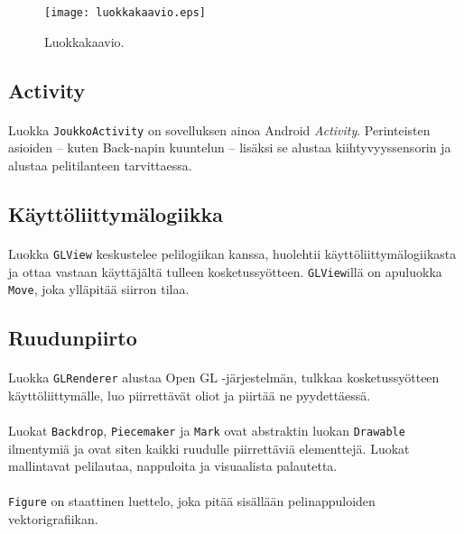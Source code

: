 \documentclass[11pt]{article}
\begin{document}
\begin{figure}
\texttt{[image: luokkakaavio.eps]}
\caption{Luokkakaavio.}
\end{figure}

\subsection{Activity}

\paragraph{} Luokka \texttt{JoukkoActivity} on sovelluksen ainoa Android \textit{Activity}. Perinteisten asioiden -- kuten Back-napin kuuntelun -- lisäksi se alustaa kiihtyvyyssensorin ja alustaa pelitilanteen tarvittaessa.

\subsection{Käyttöliittymälogiikka}

\paragraph{} Luokka \texttt{GLView} keskustelee pelilogiikan kanssa, huolehtii käyt\-tö\-liit\-ty\-mä\-lo\-gii\-kas\-ta ja ottaa vastaan käyttäjältä tulleen kosketussyötteen. \texttt{GLView}illä on apuluokka \texttt{Move}, joka ylläpitää siirron tilaa.

\subsection{Ruudunpiirto}

\paragraph{} Luokka \texttt{GLRenderer} alustaa Open GL -järjestelmän, tulkkaa kosketussyötteen käyttöliittymälle, luo piirrettävät oliot ja piirtää ne pyydettäessä.

\paragraph{} Luokat \texttt{Backdrop}, \texttt{Piecemaker} ja \texttt{Mark} ovat abstraktin luokan \texttt{Drawable} ilmentymiä ja ovat siten kaikki ruudulle piirrettäviä elementtejä. Luokat mallintavat pelilautaa, nappuloita ja visuaalista palautetta.

\paragraph{} \texttt{Figure} on staattinen luettelo, joka pitää sisällään pelinappuloiden vektorigrafiikan.
\end{document}
